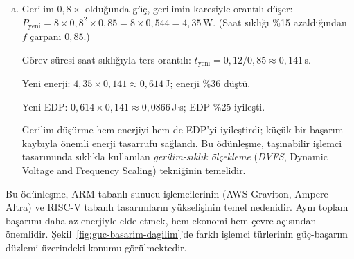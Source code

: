 \begin{ornek}[2.14]
\begin{enumerate}[(a)]
    \item Gerilim $0{,}8\times$ olduğunda güç, gerilimin karesiyle orantılı düşer: $P_{\text{yeni}} = 8 \times 0{,}8^2 \times 0{,}85 = 8 \times 0{,}544 = 4{,}35$\,W. (Saat sıklığı \%15 azaldığından $f$ çarpanı $0{,}85$.)

    Görev süresi saat sıklığıyla ters orantılı: $t_{\text{yeni}} = 0{,}12 / 0{,}85 \approx 0{,}141$\,s.

    Yeni enerji: $4{,}35 \times 0{,}141 \approx 0{,}614$\,J; enerji \%36 düştü.

    Yeni EDP: $0{,}614 \times 0{,}141 \approx 0{,}0866$\,J$\cdot$s; EDP \%25 iyileşti.

    Gerilim düşürme hem enerjiyi hem de EDP'yi iyileştirdi; küçük bir başarım kaybıyla önemli enerji tasarrufu sağlandı. Bu ödünleşme, taşınabilir işlemci tasarımında sıklıkla kullanılan \emph{gerilim-sıklık ölçekleme} (\emph{DVFS}, Dynamic Voltage and Frequency Scaling) tekniğinin temelidir.
\end{enumerate}
\end{ornek}

Bu ödünleşme, ARM tabanlı sunucu işlemcilerinin (AWS Graviton, Ampere Altra) ve RISC-V tabanlı tasarımların yükselişinin temel nedenidir. Aynı toplam başarımı daha az enerjiyle elde etmek, hem ekonomi hem çevre açısından önemlidir. Şekil~\ref{fig:guc-basarim-dagilim}'de farklı işlemci türlerinin güç-başarım düzlemi üzerindeki konumu görülmektedir.

